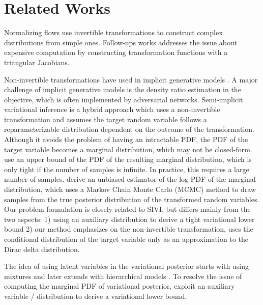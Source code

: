 \documentclass{article}
\newcommand{\acr}[1]{\textsc{#1}\xspace}
\newcommand{\sivi}{\acr{SIVI}}
\begin{document}

\section{Related Works}

Normalizing flows \citep{JimenezRezendeMohamed2015} use invertible transformations to construct complex distributions from simple ones. Follow-ups works \citep{KingmaEtAl2016, DinhEtAl2017, HuangEtAl2018} addresses the issue about expensive computation by constructing transformation functions with a triangular Jacobians.

Non-invertible transformations have used in implicit generative models \citep{MohamedLakshminarayanan2016, NowozinEtAl2016, huszar2017, TranEtAl2017, LiTurner2018, MeschederEtAl2017, ShiEtAl2018, LueckmannEtAl2018}. A major challenge of implicit generative models is the density ratio estimation in the objective, which is often implemented by adversarial networks. Semi-implicit variational inference \citep{YinZhou2018, TitsiasRuiz2019, MolchanovEtAl2019} is a hybrid approach which uses a non-invertible transformation and assumes the target random variable follows a reparameterizable distribution dependent on the outcome of the transformation. Although it avoids the problem of having an intractable PDF, the PDF of the target variable becomes a marginal distribution, which may not be closed-form. \cite{YinZhou2018, MolchanovEtAl2019} use an upper bound of the PDF of the resulting marginal distribution, which is only tight if the number of samples is infinite. In practice, this requires a large number of samples. \cite{TitsiasRuiz2019} derive an unbiased estimator of the log PDF of the marginal distribution, which uses a Markov Chain Monte Carlo (MCMC) method to draw samples from the true posterior distribution of the transformed random variables. Our problem formulation is closely related to \sivi, but differs mainly from the two aspects: 1) using an auxiliary distribution to derive a tight variational lower bound 2) our method emphasizes on the non-invertible transformation, uses the conditional distribution of the target variable only as an approximation to the Dirac delta distribution.

The idea of using latent variables in the variational posterior starts with using mixtures \citep{BishopEtAl1998, GershmanEtAl2012, SalimansKnowles2013, GuoEtAl2016, MillerEtAl2017} and later extends with hierarchical models \citep{TranEtAl2015, RanganathEtAl2016, MaaloeEtAl2016}. To resolve the issue of computing the marginal PDF of variational posterior, \cite{AgakovBarber2004, RanganathEtAl2016, TranEtAl2015, MaaloeEtAl2016} exploit an auxiliary variable / distribution to derive a variational lower bound.
\end{document}
